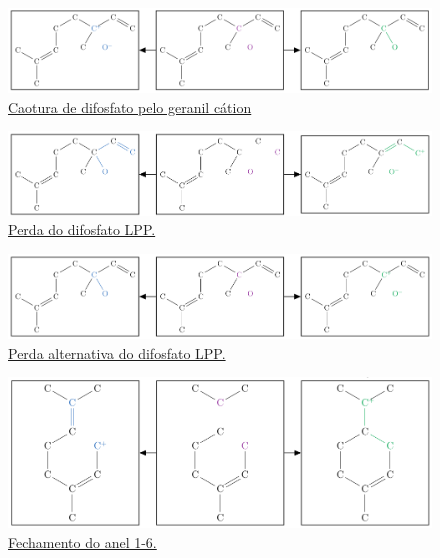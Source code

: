 \begin{figure}[H]
	\centering
	\includegraphics[width=.925\textwidth]{images/r6.png}
	\caption{\href{https://github.com/waldeyr/2PathTerpenes/blob/master/rules/opp_gain_by_geranyl_cation.gml}{Caotura de difosfato pelo geranil cátion}}
	\label{figRule6}
\end{figure}

\begin{figure}[H]
	\centering
	\includegraphics[width=.925\textwidth]{images/r7.png}
	\caption{\href{https://github.com/waldeyr/2PathTerpenes/blob/master/rules/opp_loss_for_lpp_c3.gml}{Perda do difosfato LPP.}}
	\label{figRule7}
\end{figure}

\begin{figure}[H]
	\centering
	\includegraphics[width=.925\textwidth]{images/r8.png}
	\caption{\href{https://github.com/waldeyr/2PathTerpenes/blob/master/rules/opp_loss_for_lpp_c3_alternative.gml}{Perda alternativa do difosfato LPP.}}
	\label{figRule8}
\end{figure}


\begin{figure}[H]
	\centering
	\includegraphics[width=.925\textwidth]{images/r9.png}
	\caption{\href{https://github.com/waldeyr/2PathTerpenes/blob/master/rules/1-6-closure.gml}{Fechamento do anel 1-6.}}
	\label{figRule9}
\end{figure}



